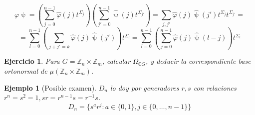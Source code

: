 \documentclass[11pt,a4paper]{article}
\theoremstyle{break}
\newtheorem{example}[theorem]{Ejemplo}
\newtheorem{task}[theorem]{Ejercicio}
\begin{document}
$$\varphi \uppsi = (\sum_{j=0}^{n-1} \hat{\varphi}(j) t^{\Sigma_{j}})(\sum_{j'=0}^{n-1} \hat{\uppsi}(j) t^{\Sigma_{j'}}) = \sum_{j, j'} \hat{\varphi}(j) \hat{\uppsi}(j') t^{\Sigma_{j}} t^{\Sigma_{j'}} =$$
$$= \sum_{l=0}^{n-1} (\sum_{j+j' = k} \hat{\varphi}(j) \hat{\uppsi}(j')) t^{\Sigma_{l}} = \sum_{l=0}^{n-1} (\sum_{j=0}^{n-1} \hat{\varphi}(j) \hat{\uppsi}(l-j)) t^{\Sigma_{l}}$$

\begin{task}
Para $G = \mathbb{Z}_{n} \times \mathbb{Z}_{m}$, calcular $\Omega_{\mathbb{C}G}$, y deducir la correspondiente base ortonormal de $\mu(\mathbb{Z}_{n} \times \mathbb{Z}_{m})$.
\end{task}

\begin{example}[Posible examen]
$D_{n}$ lo doy por generadores $r, s$ con relaciones $r^{n}=s^{2}=1, sr = r^{n-1}s = r^{-1}s$.
$$D_{n} = \{s^{a} r^{j}: a \in \{0, 1\}, j \in \{0, \dots, n-1\}\}$$


\end{example}
\end{document}
